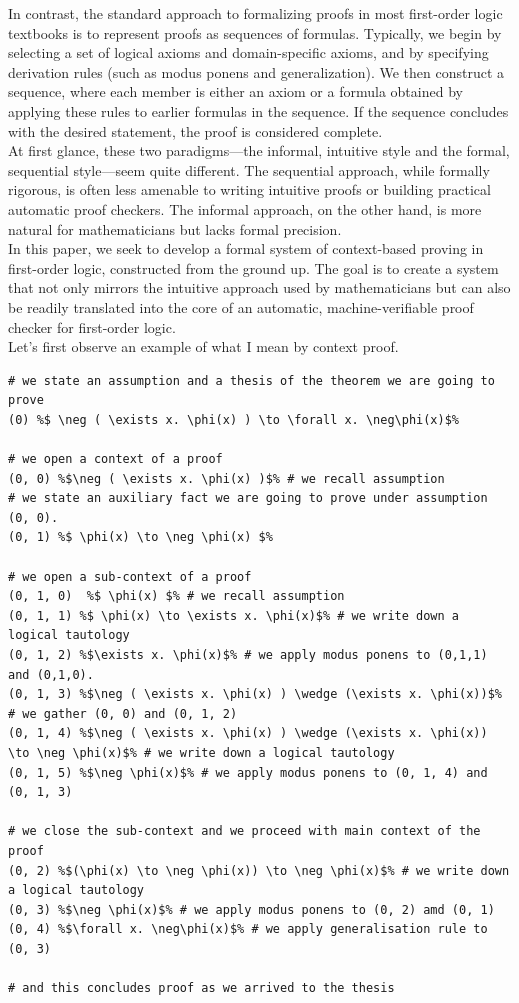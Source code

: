\documentclass[10pt]{article}
\theoremstyle{plain}
\begin{document}
In contrast, the standard approach to formalizing proofs in most first-order logic textbooks is to represent proofs as sequences of formulas. Typically, we begin by selecting a set of logical axioms and domain-specific axioms, and by specifying derivation rules (such as modus ponens and generalization). We then construct a sequence, where each member is either an axiom or a formula obtained by applying these rules to earlier formulas in the sequence. If the sequence concludes with the desired statement, the proof is considered complete.
\\

At first glance, these two paradigms—the informal, intuitive style and the formal, sequential style—seem quite different. The sequential approach, while formally rigorous, is often less amenable to writing intuitive proofs or building practical automatic proof checkers. The informal approach, on the other hand, is more natural for mathematicians but lacks formal precision.
\\

In this paper, we seek to develop a formal system of context-based proving in first-order logic, constructed from the ground up. The goal is to create a system that not only mirrors the intuitive approach used by mathematicians but can also be readily translated into the core of an automatic, machine-verifiable proof checker for first-order logic.
\\

Let's first observe an example of what I mean by context proof.

\begin{lstlisting}[texcl, escapechar=\%]
# we state an assumption and a thesis of the theorem we are going to prove
(0) %$ \neg ( \exists x. \phi(x) ) \to \forall x. \neg\phi(x)$% 

# we open a context of a proof
(0, 0) %$\neg ( \exists x. \phi(x) )$% # we recall assumption
# we state an auxiliary fact we are going to prove under assumption (0, 0).
(0, 1) %$ \phi(x) \to \neg \phi(x) $%

# we open a sub-context of a proof
(0, 1, 0)  %$ \phi(x) $% # we recall assumption
(0, 1, 1) %$ \phi(x) \to \exists x. \phi(x)$% # we write down a logical tautology
(0, 1, 2) %$\exists x. \phi(x)$% # we apply modus ponens to (0,1,1) and (0,1,0).
(0, 1, 3) %$\neg ( \exists x. \phi(x) ) \wedge (\exists x. \phi(x))$% # we gather (0, 0) and (0, 1, 2)
(0, 1, 4) %$\neg ( \exists x. \phi(x) ) \wedge (\exists x. \phi(x)) \to \neg \phi(x)$% # we write down a logical tautology
(0, 1, 5) %$\neg \phi(x)$% # we apply modus ponens to (0, 1, 4) and (0, 1, 3)

# we close the sub-context and we proceed with main context of the proof
(0, 2) %$(\phi(x) \to \neg \phi(x)) \to \neg \phi(x)$% # we write down a logical tautology 
(0, 3) %$\neg \phi(x)$% # we apply modus ponens to (0, 2) amd (0, 1)
(0, 4) %$\forall x. \neg\phi(x)$% # we apply generalisation rule to (0, 3)

# and this concludes proof as we arrived to the thesis
\end{lstlisting}
\end{document}
